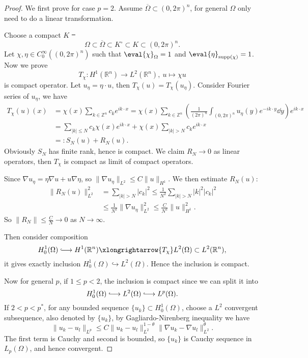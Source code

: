\documentclass[UTF8,12pt]{article}
\numberwithin{theorem}{section}
\numberwithin{equation}{section}
\newcommand{\hooklongrightarrow}{\lhook\joinrel\longrightarrow}
\begin{document}
\begin{proof}
    We first prove for case \(p=2\). Assume \(\overline{\Omega}\subset (0,2\pi)^n\),
    for general \(\Omega\) only need to do a linear transformation.

    Choose a compact
    \(K\) \st\ \[
        \Omega\subset \overline{\Omega}\subset K^\circ \subset K\subset (0,2\pi)^n
    .\] Let \(\chi,\eta\in C_0^\infty((0,2\pi)^n)\) such that \(\eval{\chi}_\Omega
    =1\) and \(\eval{\eta}_{\mathrm{supp(\chi)}}=1\). Now we prove \[
        T_{\chi}\colon H^1(\mathbb{R}^n)\longrightarrow L^2(\mathbb{R}^n),
        \ u\longmapsto \chi u
    \] is compact operator. Let \(u_\eta=\eta\cdot u\), then \(T_\chi(u)=T_\chi
    (u_{\eta})\). Consider Fourier series of \(u_{\eta}\), we have
    \begin{align*}
        T_{\chi}(u)(x)
        &=\chi(x)\sum_{k\in \mathbb{Z}^n}c_k e^{ik\cdot x}
        =\chi(x)\sum_{k\in \mathbb{Z}^n}\left(\frac{1}{(2\pi)^n}
        \int_{(0,2\pi)^n}u_\eta(y)e^{-ik\cdot y}\dd{y}\right)e^{ik\cdot x} \\
        &=\sum_{|k|\le N} c_k\chi(x)e^{ik\cdot x}
        +\chi(x)\sum_{|k|>N}c_k e^{ik\cdot x} \\
        &=:S_N(u)+R_N(u)
    .\end{align*}
    Obviously \(S_N\) has finite rank, hence is compact. We claim \(R_N\to 0\)
    as linear operators, then \(T_\chi\) is compact as limit of compact operators.

    Since \(\nabla u_\eta=\eta \nabla u+u \nabla\eta\), so \(\|\nabla u_\eta\|_{L^2}
    \le C\|u\|_{H^1}\). We then estimate \(R_N(u)\): 
    \begin{align*}
        \|R_N(u)\|_{L^2}^2
        &=\sum_{|k|>N}|c_k|^2\le \frac{1}{N^2}\sum_{|k|>N} |k|^2|c_k|^2 \\
        &\le \frac{1}{N^2}\|\nabla u_\eta\|_{L^2}^2
        \le \frac{C}{N^2}\|u\|_{H^1}^2
    .\end{align*}
    So \(\|R_N\|\le \frac{C}{N}\to 0\) as \(N\to \infty\).

    Then consider composition \[
        H_0^1(\Omega)\hooklongrightarrow H^1(\mathbb{R}^n)
        \xlongrightarrow{T_\chi}L^2(\Omega)\subset L^2(\mathbb{R}^n),
    \] it gives exactly inclusion \(H_0^1(\Omega)\hookrightarrow L^2(\Omega)\).
    Hence the inclusion is compact.

    Now for general \(p\), if \(1\le p<2\), the inclusion is compact since we can
    split it into \[
        H_0^1(\Omega)\hooklongrightarrow L^2(\Omega) \hooklongrightarrow L^p(\Omega)
    .\] If \(2<p<p^*\), for any bounded sequence \(\{u_k\}\subset H_0^1(\Omega)\),
    choose a \(L^2\) convergent subsequence, also denoted by \(\{u_k\}\), by
    Gagliardo-Nirenberg inequality we have \[
        \|u_k-u_l\|_{L^p}\le C\|u_k-u_l\|_{L^2}^{1-\theta}\|\nabla u_k
        -\nabla u_l\|_{L^2}^\theta
    .\] The first term is Cauchy and second is bounded, so \(\{u_k\}\) is Cauchy
    sequence in \(L_p(\Omega)\), and hence convergent.
\end{proof}
\end{document}
